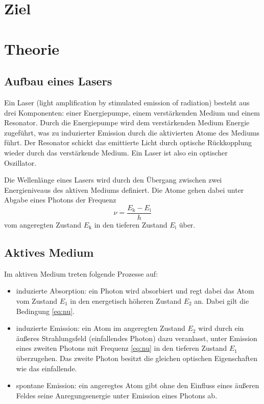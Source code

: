 \section{Ziel}

\section{Theorie}
\label{sec:Theorie}

\subsection{Aufbau eines Lasers}
Ein Laser (light amplification by stimulated emission of radiation) besteht aus drei Komponenten: einer Energiepumpe, einem verstärkenden Medium und einem Resonator.
Durch die Energiepumpe wird dem verstärkenden Medium Energie zugeführt, was zu induzierter Emission durch die aktivierten Atome des Mediums führt. Der Resonator schickt das emittierte Licht durch optische Rückkopplung wieder durch das verstärkende Medium. Ein Laser ist also ein optischer Oszillator.

Die Wellenlänge eines Lasers wird durch den Übergang zwischen zwei Energieniveaus des aktiven Mediums definiert. Die Atome gehen dabei unter Abgabe eines Photons der Frequenz
\begin{equation}
    \nu = \frac{E_\text{k} - E_\text{i}}{h}
    \label{eq:nu}
\end{equation}
vom angeregten Zustand $E_\text{k}$ in den tieferen Zustand $E_\text{i}$ über.

\subsection{Aktives Medium}
Im aktiven Medium treten folgende Prozesse auf:
\begin{itemize}
    \item induzierte Absorption: ein Photon wird absorbiert und regt dabei das Atom vom Zustand $E_1$ in den energetisch höheren Zustand $E_2$ an. Dabei gilt die Bedingung \eqref{eq:nu}.
    \item induzierte Emission: ein Atom im angeregten Zustand $E_2$ wird durch ein äußeres Strahlungsfeld (einfallendes Photon) dazu veranlasst, unter Emission eines zweiten Photons mit Frequenz \eqref{eq:nu} in den tieferen Zustand $E_1$ überzugehen. Das zweite Photon besitzt die gleichen optischen Eigenschaften wie das einfallende.
    \item spontane Emission: ein angeregtes Atom gibt ohne den Einfluss eines äußeren Feldes seine Anregungsenergie unter Emission eines Photons ab.
\end{itemize}

